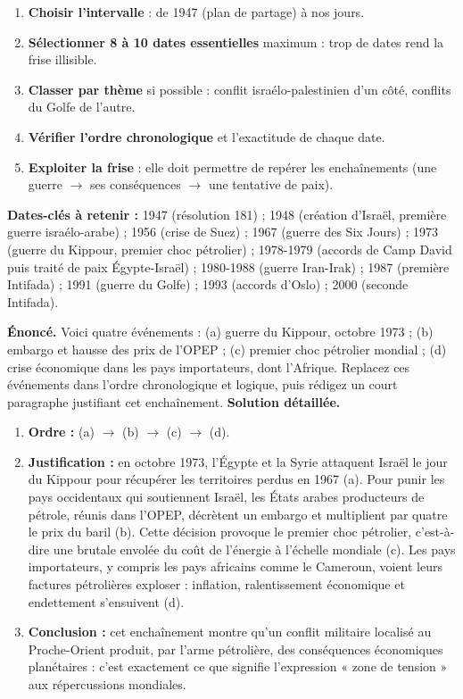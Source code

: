 \documentclass[11pt]{article}
\begin{document}
\begin{methode}
\begin{enumerate}
\item \textbf{Choisir l'intervalle} : de 1947 (plan de partage) à nos jours.
\item \textbf{Sélectionner 8 à 10 dates essentielles} maximum : trop de dates rend la frise illisible.
\item \textbf{Classer par thème} si possible : conflit israélo-palestinien d'un côté, conflits du Golfe de l'autre.
\item \textbf{Vérifier l'ordre chronologique} et l'exactitude de chaque date.
\item \textbf{Exploiter la frise} : elle doit permettre de repérer les enchaînements (une guerre $\rightarrow$ ses conséquences $\rightarrow$ une tentative de paix).
\end{enumerate}
\textbf{Dates-clés à retenir :} 1947 (résolution 181) ; 1948 (création d'Israël, première guerre israélo-arabe) ; 1956 (crise de Suez) ; 1967 (guerre des Six Jours) ; 1973 (guerre du Kippour, premier choc pétrolier) ; 1978-1979 (accords de Camp David puis traité de paix Égypte-Israël) ; 1980-1988 (guerre Iran-Irak) ; 1987 (première Intifada) ; 1991 (guerre du Golfe) ; 1993 (accords d'Oslo) ; 2000 (seconde Intifada).
\end{methode}

\begin{exoresolu}
\textbf{Énoncé.} Voici quatre événements : (a) guerre du Kippour, octobre 1973 ; (b) embargo et hausse des prix de l'OPEP ; (c) premier choc pétrolier mondial ; (d) crise économique dans les pays importateurs, dont l'Afrique. Replacez ces événements dans l'ordre chronologique et logique, puis rédigez un court paragraphe justifiant cet enchaînement.
\tcblower
\textbf{Solution détaillée.}
\begin{enumerate}
\item \textbf{Ordre :} (a) $\rightarrow$ (b) $\rightarrow$ (c) $\rightarrow$ (d).
\item \textbf{Justification :} en octobre 1973, l'Égypte et la Syrie attaquent Israël le jour du Kippour pour récupérer les territoires perdus en 1967 (a). Pour punir les pays occidentaux qui soutiennent Israël, les États arabes producteurs de pétrole, réunis dans l'OPEP, décrètent un embargo et multiplient par quatre le prix du baril (b). Cette décision provoque le premier choc pétrolier, c'est-à-dire une brutale envolée du coût de l'énergie à l'échelle mondiale (c). Les pays importateurs, y compris les pays africains comme le Cameroun, voient leurs factures pétrolières exploser : inflation, ralentissement économique et endettement s'ensuivent (d).
\item \textbf{Conclusion :} cet enchaînement montre qu'un conflit militaire localisé au Proche-Orient produit, par l'arme pétrolière, des conséquences économiques planétaires : c'est exactement ce que signifie l'expression « zone de tension » aux répercussions mondiales.
\end{enumerate}
\end{exoresolu}
\end{document}
